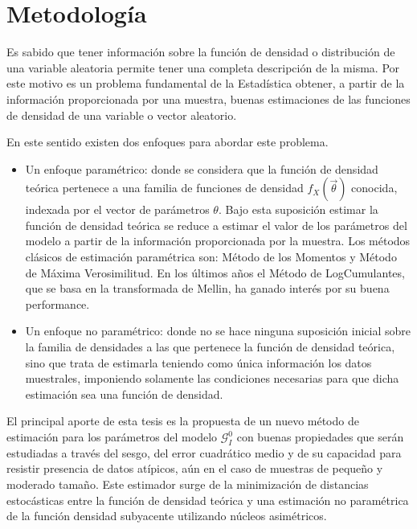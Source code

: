 
\chapter{Metodología}

Es sabido que tener información sobre la función de densidad o distribución de una variable aleatoria permite tener una completa descripción de la misma. Por este motivo es un problema fundamental de la Estadística obtener, a partir de la información proporcionada por una muestra,  buenas estimaciones de las funciones de densidad de una variable o vector aleatorio. 

En este sentido existen dos enfoques para abordar este problema. 

\begin{itemize}
	\item Un enfoque paramétrico: donde se considera que la función de densidad teórica pertenece a una familia de funciones de densidad $f_X(\vec{\theta})$
	conocida, indexada por el vector de parámetros $\theta$. Bajo esta suposición estimar la función de densidad teórica se reduce a estimar el valor de los parámetros del modelo a partir de la información proporcionada por la muestra. Los métodos clásicos de estimación paramétrica son: Método de los Momentos y Método de Máxima Verosimilitud. En los últimos años el Método de LogCumulantes, que se basa en la transformada de Mellin, ha ganado interés por su buena performance.
	\item Un enfoque no paramétrico: donde no se hace ninguna suposición inicial sobre la familia de densidades a las que pertenece la función de densidad teórica, sino que trata de estimarla teniendo como única información los datos muestrales, imponiendo  solamente las condiciones necesarias para que dicha estimación sea una función de densidad.
\end{itemize}

El principal aporte de esta tesis es la propuesta de un nuevo método de estimación para los parámetros del modelo $\mathcal G_I^0$ con buenas propiedades que serán estudiadas a través del sesgo, del error cuadrático medio y de su capacidad para resistir presencia de datos atípicos, aún en el caso de muestras de pequeño y moderado tamaño. Este estimador surge de la minimización de distancias estocásticas entre la función de densidad teórica y una estimación no paramétrica de la función densidad subyacente utilizando núcleos asimétricos. 

